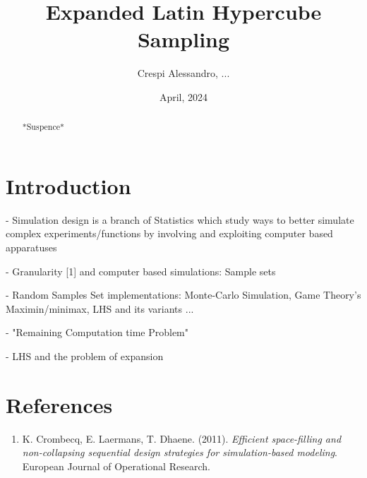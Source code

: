 \documentclass{article}
\begin{document}
\title{Expanded Latin Hypercube Sampling}
\author{Crespi Alessandro, ...}
\date{April, 2024}
\maketitle


\begin{abstract}
*Suspence*
\end{abstract}

\section*{Introduction}

- Simulation design is a branch of Statistics which study ways to better simulate complex experiments/functions by involving and exploiting computer based apparatuses

- Granularity [1] and computer based simulations: Sample sets

- Random Samples Set implementations: Monte-Carlo Simulation, Game Theory's Maximin/minimax, LHS and its variants ...

- "Remaining Computation time Problem"

- LHS and the problem of expansion



\section*{References}

\begin{enumerate}
    \item K. Crombecq, E. Laermans, T. Dhaene. (2011). \textit{Efficient space-filling and non-collapsing sequential design strategies for simulation-based modeling}. European Journal of Operational Research.
    
\end{enumerate}
\end{document}
